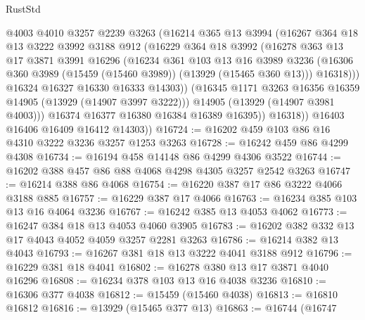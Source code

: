 \begin{lexlean}{RustStd}
\begin{coremodule}
{\begin{coremodule}
{{{{{{{{{{{{{{{{{{{{{{{{{{{{{{{{{{{{{                  @4003
                  @4010
                  @3257
                  @2239
                  @3263
                  (@16214
                    @365
                    @13
                    @3994
                    (@16267
                      @364
                      @18
                      @13
                      @3222
                      @3992
                      @3188
                      @912
                      (@16229
                        @364
                        @18
                        @3992
                        (@16278
                          @363
                          @13
                          @17
                          @3871
                          @3991
                          @16296
                          (@16234
                            @361
                            @103
                            @13
                            @16
                            @3989
                            @3236
                            (@16306 @360 @3989 (@15459 (@15460 @3989)) (@13929 (@15465 @360 @13)))
                            @16318)))
                      @16324
                      @16327
                      @16330
                      @16333
                      @14303))
                  (@16345 @1171 @3263 @16356 @16359 @14905 (@13929 (@14907 @3997 @3222)))
                  @14905
                  (@13929 (@14907 @3981 @4003)))
                @16374
                @16377
                @16380
                @16384
                @16389
                @16395))
            @16318))
        @16403
        @16406
        @16409
        @16412
        @14303))
@16724 := @16202 @459 @103 @86 @16 @4310 @3222 @3236 @3257 @1253 @3263
@16728 := @16242 @459 @86 @4299 @4308
@16734 := @16194 @458 @14148 @86 @4299 @4306 @3522
@16744 := @16202 @388 @457 @86 @88 @4068 @4298 @4305 @3257 @2542 @3263
@16747 := @16214 @388 @86 @4068
@16754 := @16220 @387 @17 @86 @3222 @4066 @3188 @885
@16757 := @16229 @387 @17 @4066
@16763 := @16234 @385 @103 @13 @16 @4064 @3236
@16767 := @16242 @385 @13 @4053 @4062
@16773 := @16247 @384 @18 @13 @4053 @4060 @3905
@16783 := @16202 @382 @332 @13 @17 @4043 @4052 @4059 @3257 @2281 @3263
@16786 := @16214 @382 @13 @4043
@16793 := @16267 @381 @18 @13 @3222 @4041 @3188 @912
@16796 := @16229 @381 @18 @4041
@16802 := @16278 @380 @13 @17 @3871 @4040 @16296
@16808 := @16234 @378 @103 @13 @16 @4038 @3236
@16810 := @16306 @377 @4038
@16812 := @15459 (@15460 @4038)
@16813 := @16810 @16812
@16816 := @13929 (@15465 @377 @13)
@16863 := @16744
    (@16747
}}}}}}}}}}}}}}}}}}}}}}}}}}}}}}}}}}}}}
\end{coremodule}}
\end{coremodule}
\end{lexlean}
